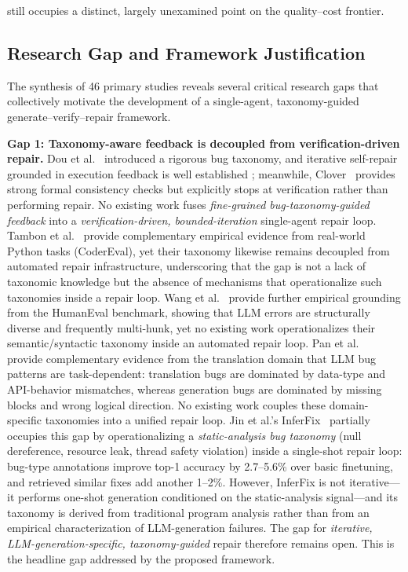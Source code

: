 \documentclass[10pt,a4paper]{article}
\begin{document}
still occupies a distinct, largely unexamined point on the quality--cost frontier.

\subsection{Research Gap and Framework Justification}
\label{sec:research_gap}
The synthesis of 46 primary studies reveals several critical research gaps that collectively motivate the development of a single-agent, taxonomy-guided generate--verify--repair framework.

\textbf{Gap 1: Taxonomy-aware feedback is decoupled from verification-driven repair.} Dou et al.~\cite{dou2026} introduced a rigorous bug taxonomy, and iterative self-repair grounded in execution feedback is well established \cite{chen2023selfdebug,wang2024intervenor}; meanwhile, Clover~\cite{sun2024clover} provides strong formal consistency checks but explicitly stops at verification rather than performing repair. No existing work fuses \textit{fine-grained bug-taxonomy-guided feedback} into a \textit{verification-driven, bounded-iteration} single-agent repair loop. Tambon et al.~\cite{tambon2025} provide complementary empirical evidence from real-world Python tasks (CoderEval), yet their taxonomy likewise remains decoupled from automated repair infrastructure, underscoring that the gap is not a lack of taxonomic knowledge but the absence of mechanisms that operationalize such taxonomies inside a repair loop. Wang et al.~\cite{wang2025where} provide further empirical grounding from the HumanEval benchmark, showing that LLM errors are structurally diverse and frequently multi-hunk, yet no existing work operationalizes their semantic/syntactic taxonomy inside an automated repair loop. Pan et al.~\cite{pan2024lost} provide complementary evidence from the translation domain that LLM bug patterns are task-dependent: translation bugs are dominated by data-type and API-behavior mismatches, whereas generation bugs are dominated by missing blocks and wrong logical direction. No existing work couples these domain-specific taxonomies into a unified repair loop. Jin et al.'s InferFix~\cite{jin2023inferfix} partially occupies this gap by operationalizing a \textit{static-analysis bug taxonomy} (null dereference, resource leak, thread safety violation) inside a single-shot repair loop: bug-type annotations improve top-1 accuracy by 2.7--5.6\% over basic finetuning, and retrieved similar fixes add another 1--2\%. However, InferFix is not iterative---it performs one-shot generation conditioned on the static-analysis signal---and its taxonomy is derived from traditional program analysis rather than from an empirical characterization of LLM-generation failures. The gap for \textit{iterative, LLM-generation-specific, taxonomy-guided} repair therefore remains open. This is the headline gap addressed by the proposed framework.
\end{document}
